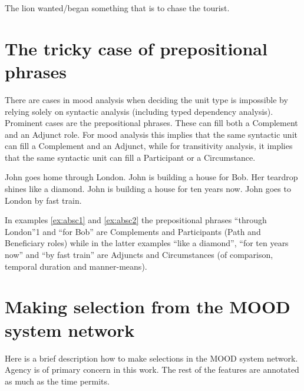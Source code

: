 \begin{exe}
    \ex The lion wanted/began something that is to chase the tourist.
\end{exe}

\section{The tricky case of prepositional phrases}

There are cases in mood analysis when deciding the unit type is impossible by relying solely on syntactic analysis (including typed dependency analysis). Prominent cases are the prepositional phrases. These can fill both a Complement and an Adjunct role. For mood analysis this implies that the same syntactic unit can fill a Complement and an Adjunct, while for transitivity analysis, it implies that the same syntactic unit can fill a Participant or a Circumstance. 

\begin{exe}
    \ex\label{ex:absc1} John goes home through London.
    \ex\label{ex:absc2} John is building a house for Bob.
    \ex Her teardrop shines like a diamond.
    \ex John is building a house for ten years now.
    \ex John goes to London by fast train.
\end{exe}

In examples \ref{ex:absc1} and \ref{ex:absc2} the prepositional phrases “through London”1 and “for Bob” are Complements and Participants (Path and Beneficiary roles) while in the latter examples ``like a diamond'', ``for ten years now'' and ``by fast train'' are Adjuncts and Circumstances (of comparison, temporal duration and manner-means).

\section{Making selection from the MOOD system network}

Here is a brief description how to make selections in the MOOD system network. Agency is of primary concern in this work. The rest of the features are annotated as much as the time permits. 

